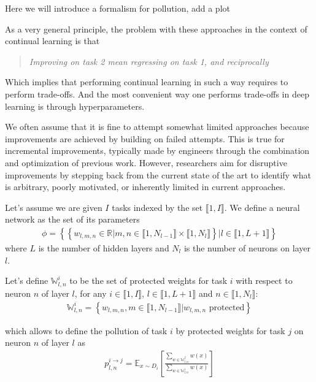 \documentclass[twocolumn]{article}
\newcommand{\intset}[2]{\llbracket #1, #2 \rrbracket}
\begin{document}
Here we will introduce a formalism for pollution, add a plot

\vspace{1mm}
\noindent
As a very general principle, the problem with these approaches in the context of continual learning is that
\begin{quote}
    \itshape
    \centering
    Improving on task 2 mean regressing on task 1, and reciprocally
\end{quote}

\noindent
Which implies that performing continual learning in such a way requires to perform trade-offs. And the most convenient way one performs trade-offs in deep learning is through hyperparameters.

\vspace{0.5cm}

\noindent
We often assume that it is fine to attempt somewhat limited approaches because improvements are achieved by building on failed attempts. This is true for incremental improvements, typically made by engineers through the combination and optimization of previous work. However, researchers aim for disruptive improvements by stepping back from the current state of the art to identify what is arbitrary, poorly motivated, or inherently limited in current approaches.

\vspace{0.5cm}


\noindent
Let's assume we are given $I$ tasks indexed by the set $\intset{1}{I}$. We define a neural network as the set of its parameters
\begin{align}
    \phi = \left\{\left\{ w_{l,m,n} \in \mathbb{R} | m,n \in \llbracket 1, N_{l-1} \rrbracket \times \llbracket 1, N_{l} \rrbracket \right\} | l \in \llbracket 1, L+1 \rrbracket \right\}
\end{align}
where $L$ is the number of hidden layers and $N_l$ is the number of neurons on layer $l$.

\noindent
Let's define $\mathbb{W}_{l,n}^i$ to be the set of protected weights for task $i$ with respect to neuron $n$ of layer $l$, for any $i \in \intset{1}{I}$, $l \in \intset{1}{L+1}$ and $n \in \intset{1}{N_l}$:
\begin{align}
    \mathbb{W}_{l,n}^i = \left\{ w_{l,m,n}, m \in \intset{1}{N_{l-1}} | w_{l,m,n} \text{ protected} \right\}
\end{align}

\noindent
which allows to define the pollution of task $i$ by protected weights for task $j$ on neuron $n$ of layer $l$ as
\begin{align}
    p_{l,n}^{i\rightarrow j} = \mathbb{E}_{x \sim D_i}\left[\frac{\sum_{w \in \mathbb{W}_{l,n}^j}{w(x)}}{\sum_{w \in \mathbb{W}_{l,n}^i}{w(x)}}\right]
\end{align}
\end{document}
